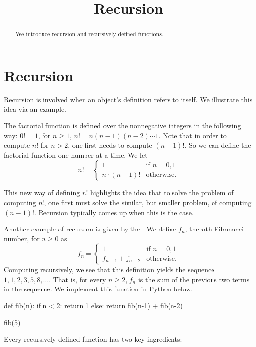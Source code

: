 \documentclass{ximera}
\title{Recursion}
\begin{document}
  
\begin{abstract}  
We introduce recursion and recursively defined functions.
\end{abstract}  
\maketitle

\section{Recursion}

Recursion is involved when an object's definition refers to itself. We illustrate this idea via an example.

The factorial function is defined over the nonnegative integers in the following way: $0!=1$, for $n\geq 1$, $n!=n(n-1)(n-2)\cdots 1$. Note that in order to compute $n!$ for $n>2$, one first needs to compute $(n-1)!$. So we can define the factorial function one number at a time. We let $$n!=\begin{cases} 1 & \text{if $n=0,1$}\\ n\cdot(n-1)! & \text{otherwise.}\end{cases}$$

This new way of defining $n!$ highlights the idea that to solve the problem of computing $n!$, one first must solve the similar, but smaller problem, of computing $(n-1)!$. Recursion typically comes up when this is the case.

Another example of recursion is given by the . We define $f_n$, the $n$th Fibonacci number, for $n\geq 0$ as $$f_n=\begin{cases} 1 & \text{if $n=0,1$}\\ f_{n-1}+f_{n-2} & \text{otherwise.}\end{cases}$$ Computing recursively, we see that this definition yields the sequence $1,1,2,3,5,8,\dots$. That is, for every $n\geq 2$, $f_n$ is the sum of the previous two terms in the sequence. We implement this function in Python below.

\begin{sageCell}
def fib(n):
        if n < 2:
                return 1
        else:
                return fib(n-1) + fib(n-2)

fib(5)
\end{sageCell}

Every recursively defined function has two key ingredients:
\end{document}
